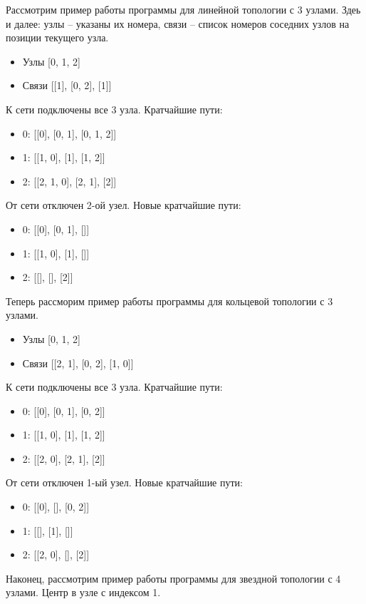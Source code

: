 Рассмотрим пример работы программы для линейной топологии с 3 узлами. Здеь и далее: узлы – указаны их номера, связи – список номеров соседних узлов на позиции текущего узла.

\begin{itemize}
	\item Узлы [0, 1, 2]
	\item Связи [[1], [0, 2], [1]]
\end{itemize}

К сети подключены все 3 узла. Кратчайшие пути:
\begin{itemize}
	\item 0: [[0], [0, 1], [0, 1, 2]]
	\item 1: [[1, 0], [1], [1, 2]]
	\item 2: [[2, 1, 0], [2, 1], [2]]
\end{itemize}

От сети отключен 2-ой узел. Новые кратчайшие пути:
\begin{itemize}
	\item 0: [[0], [0, 1], []]
	\item 1: [[1, 0], [1], []]
	\item 2: [[], [], [2]]
\end{itemize}

Теперь рассморим пример работы программы для кольцевой топологии с 3 узлами.
\begin{itemize}
	\item Узлы [0, 1, 2]
	\item Связи [[2, 1], [0, 2], [1, 0]]
\end{itemize}

К сети подключены все 3 узла. Кратчайшие пути:
\begin{itemize}
	\item 0: [[0], [0, 1], [0, 2]]
	\item 1: [[1, 0], [1], [1, 2]]
	\item 2: [[2, 0], [2, 1], [2]]
\end{itemize}

От сети отключен 1-ый узел. Новые кратчайшие пути:
\begin{itemize}
	\item 0: [[0], [], [0, 2]]
	\item 1: [[], [1], []]
	\item 2: [[2, 0], [], [2]]
\end{itemize}


Наконец, рассмотрим пример работы программы для звездной топологии с 4 узлами. Центр в узле с индексом 1.

